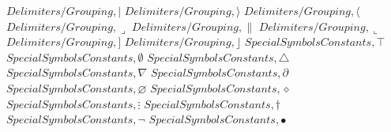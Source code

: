 \documentclass{article}
\begin{document}
\linebreak
$Delimiters/Grouping,|$
\linebreak
\linebreak
$Delimiters/Grouping,\rangle$
\linebreak
\linebreak
$Delimiters/Grouping,\langle$
\linebreak
\linebreak
$Delimiters/Grouping,\lrcorner$
\linebreak
\linebreak
$Delimiters/Grouping,\|$
\linebreak
\linebreak
$Delimiters/Grouping,\llcorner$
\linebreak
\linebreak
$Delimiters/Grouping,]$
\linebreak
\linebreak
$Delimiters/Grouping,\rfloor$
\linebreak
\linebreak
$Special Symbols Constants,\top$
\linebreak
\linebreak
$Special Symbols Constants,\emptyset$
\linebreak
\linebreak
$Special Symbols Constants,\triangle$
\linebreak
\linebreak
$Special Symbols Constants,\nabla$
\linebreak
\linebreak
$Special Symbols Constants,\partial$
\linebreak
\linebreak
$Special Symbols Constants,\varnothing$
\linebreak
\linebreak
$Special Symbols Constants,\diamond$
\linebreak
\linebreak
$Special Symbols Constants,\vdots$
\linebreak
\linebreak
$Special Symbols Constants,\dagger$
\linebreak
\linebreak
$Special Symbols Constants,\neg$
\linebreak
\linebreak
$Special Symbols Constants,\bullet$
\linebreak
\linebreak
\end{document}
